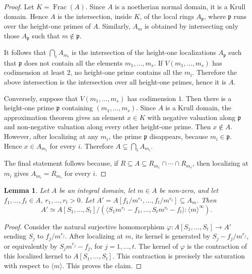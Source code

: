 \documentclass{amsart}
\newtheorem{lemma}[theorem]{Lemma}
\theoremstyle{definition}
\theoremstyle{remark}
\begin{document}
\begin{proof}
Let $K=\operatorname{Frac}(A)$. Since $A$ is a noetherian normal domain, it
is a Krull domain. Hence $A$ is the intersection, inside $K$, of the
local rings $A_{\mathfrak p}$, where $\mathfrak p$ runs over the
height-one primes of $A$. Similarly, $A_m$ is obtained by intersecting only
those $A_{\mathfrak p}$ such that $m\notin\mathfrak p$.

It follows that $\bigcap_i A_{m_i}$ is the intersection of the height-one
localizations $A_{\mathfrak p}$ such that $\mathfrak p$ does not contain
all the elements $m_1,\dots,m_s$. If $V(m_1,\dots,m_s)$ has codimension at
least $2$, no height-one prime contains all the $m_i$. Therefore the above
intersection is the intersection over all height-one primes, hence it is $A$.

Conversely, suppose that $V(m_1,\dots,m_s)$ has codimension $1$. Then there
is a height-one prime $\mathfrak p$ containing $(m_1,\dots,m_s)$. Since
$A$ is a Krull domain, the approximation theorem gives an element
$x\in K$ with negative valuation along $\mathfrak p$ and non-negative
valuation along every other height-one prime. Then $x\notin A$. However,
after localizing at any $m_i$, the prime $\mathfrak p$ disappears, because
$m_i\in\mathfrak p$. Hence $x\in A_{m_i}$ for every $i$. Therefore
$A\subsetneq \bigcap_i A_{m_i}$.

The final statement follows because, if
$R\subseteq A\subseteq R_{m_1}\cap\cdots\cap R_{m_s}$, then localizing at
$m_i$ gives $A_{m_i}=R_{m_i}$ for every $i$.
\end{proof}

\begin{lemma}
\label{lem:sat}
Let $A$ be an integral domain, let $m\in A$ be non-zero, and let
$f_1,\dots,f_t\in A$, $r_1,\dots,r_t>0$. Let
$A'=A[f_1/m^{r_1},\dots,f_t/m^{r_t}]\subseteq A_m$. Then
\[
A'\simeq
A[S_1,\dots,S_t]\Big/
\left(
\langle S_1m^{r_1}-f_1,\dots,S_tm^{r_t}-f_t\rangle
:\langle m\rangle^\infty
\right).
\]
\end{lemma}

\begin{proof}
Consider the natural surjective homomorphism
$\varphi:A[S_1,\dots,S_t]\to A'$ sending $S_j$ to $f_j/m^{r_j}$.
After localizing at $m$, its kernel is generated by
$S_j-f_j/m^{r_j}$, or equivalently by $S_jm^{r_j}-f_j$, for
$j=1,\dots,t$. The kernel of $\varphi$ is the contraction of this localized
kernel to $A[S_1,\dots,S_t]$. This contraction is precisely the saturation
with respect to $\langle m\rangle$. This proves the claim.
\end{proof}
\end{document}
